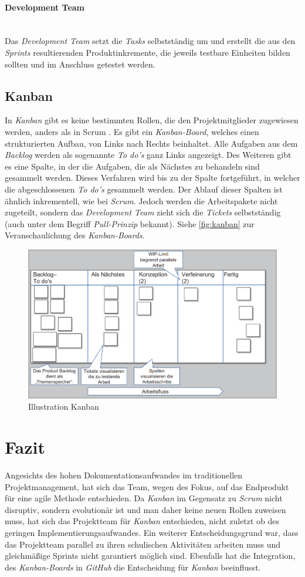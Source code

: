 \paragraph{Development Team}~\\
Das \textit{Development Team} setzt die \textit{Tasks} selbstständig um und erstellt die aus den \textit{Sprints} resultierenden Produktinkremente, die jeweils testbare Einheiten bilden sollten und im Anschluss getestet werden.

\subsection{Kanban}
In \textit{Kanban} gibt es keine bestimmten Rollen, die den Projektmitglieder zugewiesen werden, anders als in Scrum \cite{pm-agil-ursula}. Es gibt ein \textit{Kanban-Board}, welches einen strukturierten Aufbau, von Links nach Rechts beinhaltet. Alle Aufgaben aus dem \textit{Backlog} werden als sogenannte \textit{To do's} ganz Links angezeigt. Des Weiteren gibt es eine Spalte, in der die Aufgaben, die als Nächstes zu behandeln sind gesammelt werden. Dieses Verfahren wird bis zu der Spalte fortgeführt, in welcher die abgeschlossenen \textit{To do's} gesammelt werden. Der Ablauf dieser Spalten ist ähnlich inkrementell, wie bei \textit{Scrum}. Jedoch werden die Arbeitspakete nicht zugeteilt, sondern das \textit{Development Team} zieht sich die \textit{Tickets} selbstständig (auch unter dem Begriff \textit{Pull-Prinzip} bekannt). Siehe \autoref{fig:kanban} zur Veranschaulichung des \textit{Kanban-Boards}. 
\begin{figure}[H]
	\centering
	\includegraphics[width=0.6\linewidth]{images/projektmanagement/kanban}
	\caption[Kanban]{Illustration Kanban \cite{pm-agil-ursula}}
	\label{fig:kanban}
\end{figure}
\section{Fazit}
Angesichts des hohen Dokumentationsaufwandes im traditionellen Projektmanagement, hat sich das Team, wegen des Fokus, auf das Endprodukt für eine agile Methode entschieden. Da \textit{Kanban} im Gegensatz zu \textit{Scrum} nicht disruptiv, sondern evolutionär ist und man daher keine neuen Rollen zuweisen muss, hat sich das Projektteam für \textit{Kanban} entschieden, nicht zuletzt ob des geringen Implementierungsaufwandes. Ein weiterer Entscheidungsgrund war, dass das Projektteam parallel zu ihren schulischen Aktivitäten arbeiten muss und gleichmäßige Sprints nicht garantiert möglich sind. Ebenfalls hat die Integration, des \textit{Kanban-Boards} in \textit{GitHub} die Entscheidung für \textit{Kanban} beeinflusst.